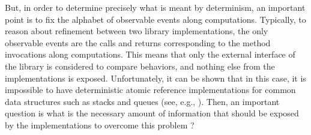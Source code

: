 But, in order to determine precisely what is meant by determinism, an important point is to fix the alphabet of observable events along computations. 
Typically, to reason about refinement between two library implementations, the only observable events are the calls and returns corresponding to the method invocations along computations. This means that only the external interface of the library is considered to compare behaviors, and nothing else from the implementations is exposed. Unfortunately, it can be shown that in this case, it is impossible to have deterministic atomic reference implementations for common data structures such as stacks and queues (see, e.g., \cite{DBLP:conf/cav/SchellhornWD12}). Then, an important question is what is the necessary amount of information that should be exposed by the implementations to overcome this problem ?

